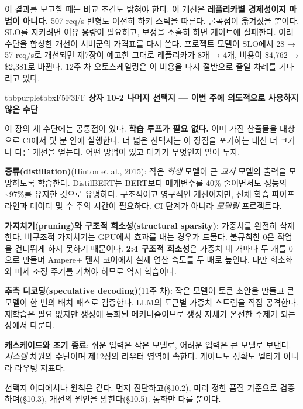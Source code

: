 이 결과를 보고할 때는 비교 조건도 밝혀야 한다. 이 개선은 \textbf{레플리카별 경제성이지 마법이 아니다.} 507 req/s 변형도 여전히 하키 스틱을 따른다. 굴곡점이 옮겨졌을 뿐이다. SLO를 지키려면 여유 용량이 필요하고, 보정을 소홀히 하면 게이트에 실패한다. 여러 수단을 합성한 개선이 서버군의 가격표를 다시 쓴다. 프로젝트 모델이 SLO에서 28 → 57 req/s로 개선되면 제7장이 예고한 그대로 레플리카가 8개 → 4개, 비용이 \$4,762 → \$2,381로 바뀐다. 12주 차 오토스케일링은 이 비용을 다시 절반으로 줄일 차례를 기다리고 있다.

\begin{calloutbox}{tbbpurple}{tbbxF5F3FF}
{\normalsize\bfseries\color{tbbx5B21B6}상자 10-2  나머지 선택지 — 이번 주에 의도적으로 사용하지 않은 수단}\par\vspace{3pt}
이 장의 세 수단에는 공통점이 있다. \textbf{학습 루프가 필요 없다.} 이미 가진 산출물을 대상으로 CI에서 몇 분 안에 실행한다. 더 넓은 선택지는 이 장점을 포기하는 대신 더 크거나 다른 개선을 얻는다. 어떤 방법이 있고 대가가 무엇인지 알아 두자.

\begin{tbbitemize}
  \item \textbf{증류(distillation)}(Hinton et al., 2015): 작은 \textit{학생} 모델이 큰 \textit{교사} 모델의 출력을 모방하도록 학습한다. DistilBERT는 BERT보다 매개변수를 40\% 줄이면서도 성능의 \textasciitilde{}97\%를 유지한 것으로 유명하다. 구조적이고 영구적인 개선이지만, 전체 학습 파이프라인과 데이터 및 수 주의 시간이 필요하다. CI 단계가 아니라 \textit{모델링} 프로젝트다.
  \item \textbf{가지치기(pruning)와 구조적 희소성(structural sparsity)}: 가중치를 완전히 삭제한다. 비구조적 가지치기는 GPU에서 효과를 내는 경우가 드물다. 불규칙한 0은 작업을 건너뛰게 하지 못하기 때문이다. \textbf{2:4 구조적 희소성}은 가중치 네 개마다 두 개를 0으로 만들며 Ampere+ 텐서 코어에서 실제 연산 속도를 두 배로 높인다. 다만 희소화와 미세 조정 주기를 거쳐야 하므로 역시 학습이다.
  \item \textbf{추측 디코딩(speculative decoding)}(11주 차): 작은 모델이 토큰 초안을 만들고 큰 모델이 한 번의 배치 패스로 검증한다. LLM의 토큰별 가중치 스트림을 직접 공격한다. 재학습은 필요 없지만 생성에 특화된 메커니즘이므로 생성 자체가 온전한 주제가 되는 장에서 다룬다.
  \item \textbf{캐스케이드와 조기 종료}: 쉬운 입력은 작은 모델로, 어려운 입력은 큰 모델로 보낸다. \textit{시스템} 차원의 수단이며 제12장의 라우터 영역에 속한다. 게이트도 정확도 델타가 아니라 라우팅 지표다.
\end{tbbitemize}

선택지 어디에서나 원칙은 같다. 먼저 진단하고(§10.2), 미리 정한 품질 기준으로 검증하며(§10.3), 개선의 원인을 밝힌다(§10.5). 통화만 다를 뿐이다.
\end{calloutbox}

